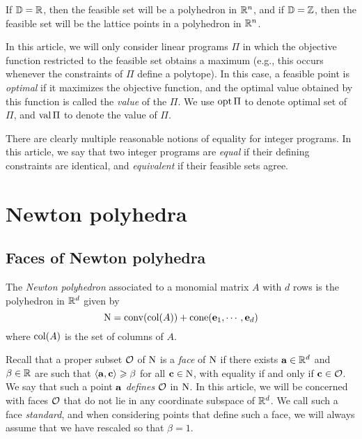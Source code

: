 \documentclass[11pt]{amsart}
\begin{document}
If $\mathbb{D} = \mathbb{R}$, then the feasible set  will be a polyhedron in $\mathbb{R}^n$, and if $\mathbb{D} = \mathbb{Z}$, then the feasible set will be the lattice points in a polyhedron in $\mathbb{R}^n$.  

In this article, we will only consider linear programs $\Pi$ in which the objective function restricted to the feasible set obtains a maximum (e.g., this occurs whenever the constraints of $\Pi$ define a polytope).  In this case, a feasible point is \emph{optimal} if it maximizes the objective function, and the optimal value obtained by this function is called the \emph{value} of the $\Pi$.  We use $\operatorname{opt} \Pi$ to denote optimal set of $\Pi$, and $\operatorname{val} \Pi$ to denote the value of $\Pi$. 

There are clearly multiple reasonable notions of equality for integer programs.  In this article,  we say that two integer programs are \emph{equal} if their defining constraints are identical, and \emph{equivalent} if their feasible sets agree. 




\newpage

\section{Newton polyhedra}
\label{newton-polyhedra: S}


\subsection{Faces of Newton polyhedra} The \emph{Newton polyhedron} associated to a monomial matrix $A$ with $d$ rows is the polyhedron in $\mathbb{R}^d$ given by 
\[ \mathrm{N} = \operatorname{conv}( \operatorname{col}(A) ) + \operatorname{cone}( \mathbf{e}_1, \cdots, \mathbf{e}_d) \] where $\operatorname{col}(A)$ is the set of columns of $A$.  

Recall that a proper  subset $\mathcal{O}$ of $\mathrm{N}$ is a \emph{face} of $\mathrm{N}$  if there exists $\mathbf{a} \in \mathbb{R}^d$ and $\beta \in \mathbb{R}$ are such that $\langle \mathbf{a}, \mathbf{c} \rangle \geqslant \beta$ for all $\mathbf{c} \in \mathrm{N}$, with equality if and only if $\mathbf{c} \in \mathcal{O}$.  We say that  such a point $\mathbf{a}$ \emph{defines} $\mathcal{O}$ in $\mathrm{N}$.    In this article, we will be concerned with faces $\mathcal{O}$ that do not lie in any coordinate subspace of $\mathbb{R}^d$.  We call such a face \emph{standard}, and when considering points that define such a face, we will always assume that we have rescaled so that $\beta = 1$. 
\end{document}
